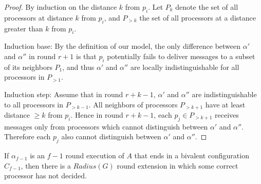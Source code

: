 \begin{proof}
By induction on the distance $k$ from $p_i$. Let $P_k$ denote the set of
all processors at distance $k$ from $p_i$, and $P_{>k}$ the set of all
processors at a distance greater than $k$ from $p_i$.

Induction base: By the definition of our model, the only difference 
between $\alpha'$ and $\alpha''$ in round $r+1$ is that $p_i$ potentially fails
to deliver messages to a subset of its neighbors $P_1$, and thus $\alpha'$ and $\alpha''$
are locally indistinguishable for all processors in $P_{>1}$.

Induction step: Assume that in round $r+k-1$, $\alpha'$ and $\alpha''$ are
indistinguishable to all processors in $P_{>k-1}$. 
All neighbors of processors $P_{>k+1}$ have at least distance $\geq k$
from $p_i$. Hence in round $r+k-1$, each $p_j \in P_{>k+1}$ receives messages
only from processors which cannot distinguish between $\alpha'$ and $\alpha''$.
Therefore each $p_j$ also cannot distinguish between $\alpha'$ and $\alpha''$.
\end{proof}


\begin{lemma}
If $\alpha_{f-1}$ is an $f-1$ round execution of $A$ that ends in a bivalent
configuration $C_{f-1}$, then there is a $Radius(G)$ round extension in which
some correct processor has not decided.
\end{lemma}

